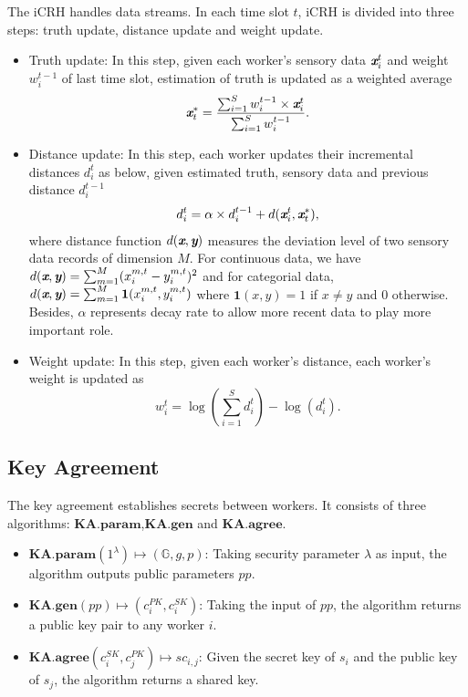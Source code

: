 \documentclass[conference,a4paper]{IEEEtran}
\def\textbi#1{\textbf{\em #1}}
\begin{document}
    The iCRH handles data streams. In each time slot $t$, iCRH is divided into three steps: truth update, distance update and weight update.
    \begin{itemize}
        \item Truth update: In this step, given each worker's sensory data $\textbi{x}_i^t$ and weight $w_i^{t-1}$ of last time slot, estimation of truth is updated as a weighted average
            \begin{equation}\label{icrh-truth}
                \textbi{x}_t^*=\frac{\sum_{i=1}^{S} w_i^{t-1} \times \textbi{x}_i^t}{\sum_{i=1}^{S} w_i^{t-1}}.
            \end{equation}
        \item Distance update: In this step, each worker updates their incremental distances $d_i^t$ as below, given estimated truth, sensory data and previous distance $d_i^{t-1}$
            \begin{equation}\label{icrh-distance}
                d_i^t=\alpha\times d_i^{t-1}+d(\textbi{x}_i^t, \textbi{x}_t^*),
            \end{equation}
            where distance function $d(\textbi{x},\textbi{y})$ measures the deviation level of two sensory data records of dimension $M$. For continuous data, we have $d(\textbi{x},\textbi{y})=\sum_{m=1}^{M} (x_i^{m,t}-y_i^{m,t})^2$ and for categorial data, $d(\textbi{x},\textbi{y})=\sum_{m=1}^{M} \textbf{1}(x_i^{m,t},y_i^{m,t})$ where $\textbf{1}(x,y)=1$ if $x\ne y$ and 0 otherwise. Besides, $\alpha$ represents decay rate to allow more recent data to play more important role.
        \item Weight update: In this step, given each worker's distance, each worker's weight is updated as
            \begin{equation}\label{icrh-weight}
                w_i^t=\log (\sum_{i=1}^{S} d_i^t)-\log (d_i^t).
            \end{equation}
    \end{itemize}
    \subsection{Key Agreement}
    The key agreement  establishes secrets between workers. It consists of three algorithms:
    $\mathbf{KA.param}$,$\mathbf{KA.gen}$ and $\mathbf{KA.agree}$.
    \begin{itemize}
        \item $\mathbf{KA.param}(1^\lambda)\mapsto (\mathbb{G},g,p)$: Taking security parameter $\lambda$ as input, the algorithm outputs public parameters $pp$.
        \item $\mathbf{KA.gen}(pp)\mapsto (c_i^{PK},c_i^{SK})$: Taking the input of $pp$, the algorithm returns a public key pair to any worker $i$.
        \item $\mathbf{KA.agree}(c_i^{SK},c_j^{PK})\mapsto sc_{i,j}$: Given the secret key of $s_i$ and the public key of $s_j$, the algorithm returns a shared key.
    \end{itemize}
\end{document}
